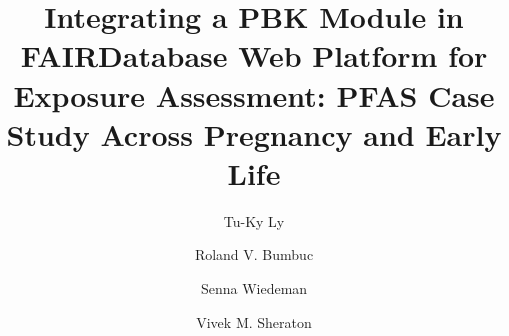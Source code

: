 \documentclass[preprint,12pt]{elsarticle}
\begin{document}
\begin{frontmatter}

\title{\bfseries Integrating a PBK Module in FAIRDatabase Web Platform for Exposure Assessment: PFAS Case Study Across Pregnancy and Early Life}


\author[1,2]{Tu-Ky Ly}
\author[1,2,3,4]{Roland V. Bumbuc}
\author[2]{Senna Wiedeman}
\author[1,2]{Vivek M. Sheraton}

\address[1]{Computational Science Lab, Informatics Institute,
University of Amsterdam, Amsterdam, The Netherlands}
\address[2]{Informatics Institute, University of Amsterdam,
Amsterdam, The Netherlands}
\address[3]{Department of Plastic, Reconstructive and Hand Surgery,
Amsterdam Movement Sciences (AMS) Institute, Amsterdam UMC,
Location VUmc, Amsterdam, The Netherlands}
\address[4]{Department of Molecular Cell Biology and Immunology,
Amsterdam Infection and Immunity (AII) Institute, Amsterdam UMC,
Location VUmc, Amsterdam, The Netherlands}

\end{frontmatter}

\end{document}

